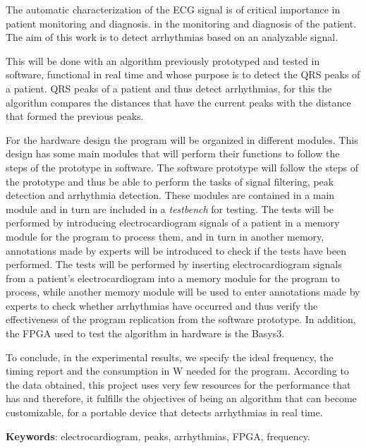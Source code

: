 The automatic characterization of the ECG signal is of critical importance in patient monitoring and diagnosis.
in the monitoring and diagnosis of the patient.
The aim of this work is to detect arrhythmias based on an analyzable signal.

This will be done with an algorithm previously prototyped and tested in software, functional in real time and whose purpose is to detect the QRS peaks of a patient.
QRS peaks of a patient and thus detect arrhythmias, for this the algorithm compares the distances that have the current peaks with the distance that formed the previous peaks.

For the hardware design the program will be organized in different modules. This design has some main modules that will perform their functions to follow the steps of the prototype in software.
The software prototype will follow the steps of the prototype and thus be able to perform the tasks of signal filtering, peak detection and arrhythmia detection.
These modules are contained in a main module and in turn are included in a \textit{testbench} for testing. 
The tests will be performed by introducing electrocardiogram signals of a patient in a memory module for the program to process them, and in turn in another memory, annotations made by experts will be introduced to check if the tests have been performed.
The tests will be performed by inserting electrocardiogram signals from a patient's electrocardiogram into a memory module for the program to process, while another memory module will be used to enter annotations made by experts to check whether arrhythmias have occurred and thus verify the effectiveness of the program replication from the software prototype.  In addition, the FPGA used to test the algorithm in hardware is the Basys3.

To conclude, in the experimental results, we specify the ideal frequency, the timing report and the
consumption in W needed for the program. According to the data obtained, this project uses very few resources for the performance that has
and therefore, it fulfills the objectives of being an algorithm that can become customizable, for a portable device that detects arrhythmias in real time.

\noindent\textbf{Keywords}: electrocardiogram, peaks, arrhythmias, FPGA, frequency.